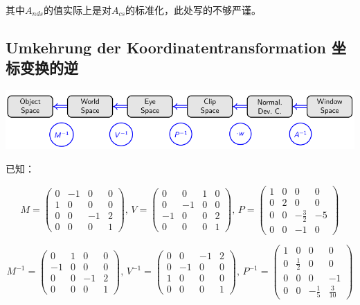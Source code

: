 \documentclass[fleqn]{article}
\begin{document}
其中$A_{nds}$的值实际上是对$A_{cs}$的标准化，此处写的不够严谨。

\subsection{Umkehrung der Koordinatentransformation 坐标变换的逆}

\begin{center}
    \includegraphics[scale=0.45]{15.png}
\end{center}

\noindent 已知：

$$M=\begin{pmatrix}
    0&-1&0&0\\
    1&0&0&0\\
    0&0&-1&2\\
    0&0&0&1
\end{pmatrix},\,V=\begin{pmatrix}
    0&0&1&0\\
    0&-1&0&0\\
    -1&0&0&2\\
    0&0&0&1
\end{pmatrix},\,P=\begin{pmatrix}
    1&0&0&0\\
    0&2&0&0\\
    0&0&-\frac{3}{2}&-5\\
    0&0&-1&0
\end{pmatrix}$$

$$M^{-1}=\begin{pmatrix}
    0&1&0&0\\
    -1&0&0&0\\
    0&0&-1&2\\
    0&0&0&1
\end{pmatrix},\,V^{-1}=\begin{pmatrix}
    0&0&-1&2\\
    0&-1&0&0\\
    1&0&0&0\\
    0&0&0&1
\end{pmatrix},\,P^{-1}=\begin{pmatrix}
    1&0&0&0\\
    0&\frac{1}{2}&0&0\\
    0&0&0&-1\\
    0&0&-\frac{1}{5}&\frac{3}{10}
\end{pmatrix}$$
\end{document}
